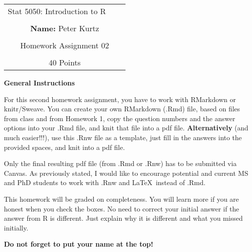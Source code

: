 \documentclass[12pt,letterpaper,final]{article}\usepackage[]{graphicx}\usepackage[]{xcolor}
\begin{document}
\begin{table}\centering
\begin{tabular*}{6.15in}{@{\extracolsep{\fill}}|llr|} \hline
Stat 5050: Introduction to R & \hspace*{0.5 in} \\
 & & \\
\multicolumn{3}{|c|}{
{\bf Name:} Peter Kurtz} \\
 & & \\
\multicolumn{3}{|c|}{
Homework Assignment 02} \\
 & & \\
\multicolumn{3}{|c|}{
40 Points} \\
\hline
\end{tabular*}
\end{table}


{\bf General Instructions}

For this second homework assignment, you have to work with RMarkdown or knitr/Sweave.
You can create your own RMarkdown (.Rmd) file,
based on files from class and from Homework 1, copy the
question numbers and the answer options into your .Rmd file, 
and knit that file into a pdf file. 
{\bf Alternatively} (and much easier!!!), use this .Rnw file as a 
template, just fill in the answers into the provided spaces,
and knit into a pdf file.

Only the final resulting pdf file (from .Rmd or .Rnw) has to be submitted via Canvas.
As previously stated, I would like to encourage potential and current MS and PhD students
to work with .Rnw and \LaTeX\ instead of .Rmd.

This homework will be graded on completeness. You will learn more if 
you are honest when you check the boxes. 
No need to correct your initial answer if the answer from R is different.
Just explain why it is different and what you missed initially.

{\bf Do not forget to put your name at the top!}
\end{document}
